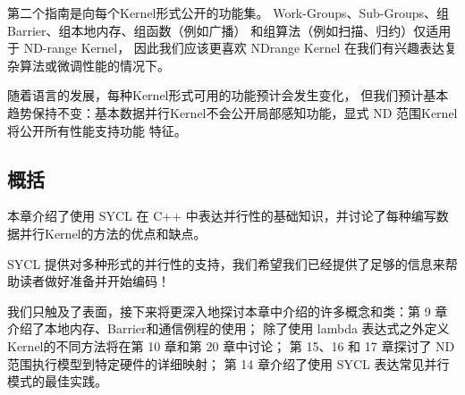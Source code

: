 第二个指南是向每个Kernel形式公开的功能集。 Work-Groups、Sub-Groups、组Barrier、组本地内存、组函数（例如广播）
和组算法（例如扫描、归约）仅适用于 ND-range Kernel，
因此我们应该更喜欢 NDrange Kernel 在我们有兴趣表达复杂算法或微调性能的情况下。

随着语言的发展，每种Kernel形式可用的功能预计会发生变化，
但我们预计基本趋势保持不变：基本数据并行Kernel不会公开局部感知功能，显式 ND 范围Kernel将公开所有性能支持功能 特征。

\subsection{概括}
本章介绍了使用 SYCL 在 C++ 中表达并行性的基础知识，并讨论了每种编写数据并行Kernel的方法的优点和缺点。

SYCL 提供对多种形式的并行性的支持，我们希望我们已经提供了足够的信息来帮助读者做好准备并开始编码！

我们只触及了表面，接下来将更深入地探讨本章中介绍的许多概念和类：第 9 章介绍了本地内存、Barrier和通信例程的使用； 
除了使用 lambda 表达式之外定义Kernel的不同方法将在第 10 章和第 20 章中讨论； 
第 15、16 和 17 章探讨了 ND 范围执行模型到特定硬件的详细映射； 
第 14 章介绍了使用 SYCL 表达常见并行模式的最佳实践。